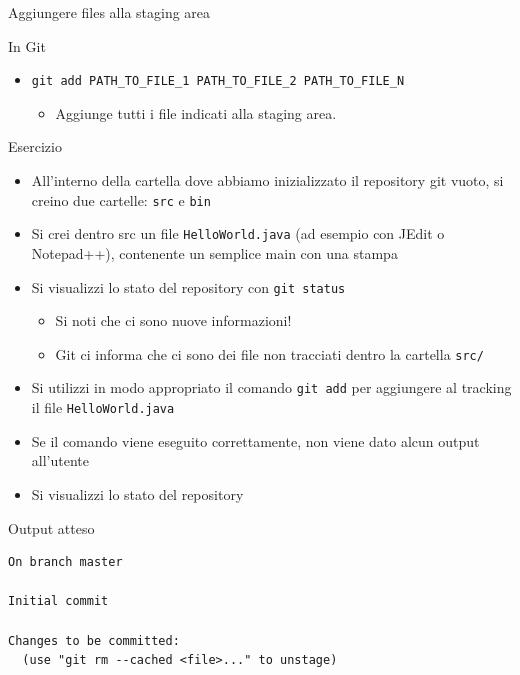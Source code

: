 \documentclass[presentation]{beamer}
\begin{document}
\begin{frame}{Aggiungere files alla staging area}
\begin{block}{In Git}
\begin{itemize}
\begin{itemize}
				\item Il file deve essere cambiato rispetto allo stato precedente (perché nuovo, modificato, o cancellato)
				\item Il file può essere un file che esisteva ma è stato cancellato!
				\item In questo caso, viene registrata nella staging area la cancellazione
			\end{itemize}
			\item \texttt{git add PATH\_TO\_FILE\_1 PATH\_TO\_FILE\_2 PATH\_TO\_FILE\_N}
			\begin{itemize}
				\item Aggiunge tutti i file indicati alla staging area.
			\end{itemize}
		\end{itemize}
	\end{block}
	\begin{block}{Esercizio}	
		\begin{itemize}
			\item All'interno della cartella dove abbiamo inizializzato il repository git vuoto, si creino due cartelle: \texttt{src} e \texttt{bin}
			\item Si crei dentro src un file \texttt{HelloWorld.java} (ad esempio con JEdit o Notepad++), contenente un semplice main con una stampa
			\item Si visualizzi lo stato del repository con \texttt{git status}
			\begin{itemize}
				\item Si noti che ci sono nuove informazioni!
				\item Git ci informa che ci sono dei file non tracciati dentro la cartella \texttt{src/}
			\end{itemize}
			\item Si utilizzi in modo appropriato il comando \texttt{git add} per aggiungere al tracking il file \texttt{HelloWorld.java}
			\item Se il comando viene eseguito correttamente, non viene dato alcun output all'utente
			\item Si visualizzi lo stato del repository
		\end{itemize}
	\end{block}
	\begin{block}{Output atteso}
		\begin{Verbatim}[fontsize=\scriptsize]
On branch master

Initial commit

Changes to be committed:
  (use "git rm --cached <file>..." to unstage)


\end{Verbatim}
\end{block}
\end{frame}
\end{document}
